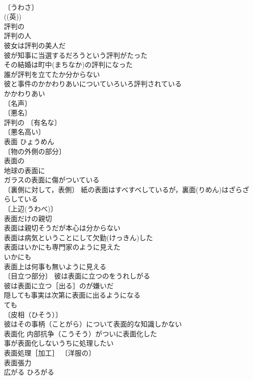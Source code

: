\documentclass[8pt]{extreport}
\begin{document}
\begin{CJK}{UTF8}{min}
\\	〔うわさ〕
\\	((英)) 
\\	評判の 
\\	評判の人 
\\	彼女は評判の美人だ 
\\	彼が知事に当選するだろうという評判がたった 
\\	その結婚は町中(まちなか)の評判になった 
\\	誰が評判を立てたか分からない 
\\	彼と事件のかかわりあいについていろいろ評判されている 
\\	かかわりあい　
\\	〔名声〕
\\	〔悪名〕
\\	評判の 〔有名な〕
\\	〔悪名高い〕
\\	表面	ひょうめん	
\\	〔物の外側の部分〕
\\	表面の 
\\	地球の表面に 
\\	ガラスの表面に傷がついている 
\\	〔裏側に対して，表側〕 紙の表面はすべすべしているが，裏面(りめん)はざらざらしている 
\\	〔上辺(うわべ)〕 
\\	表面だけの親切 
\\	表面は親切そうだが本心は分からない 
\\	表面は病気ということにして欠勤(けっきん)した 
\\	表面はいかにも専門家のように見えた 
\\	いかにも　
\\	表面上は何事も無いように見える 
\\	〔目立つ部分〕 彼は表面に立つのをうれしがる 
\\	彼は表面に立つ［出る］のが嫌いだ 
\\	隠しても事実は次第に表面に出るようになる 
\\	ても　
\\	〔皮相（ひそう）〕　
\\	彼はその事柄（ことがら）について表面的な知識しかない 
\\	表面化 内部抗争（こうそう）がついに表面化した 
\\	事が表面化しないうちに処理したい 
\\	表面処理［加工］ 〔洋服の〕
\\	表面張力 
\\	広がる	ひろがる	

\end{CJK}
\end{document}
